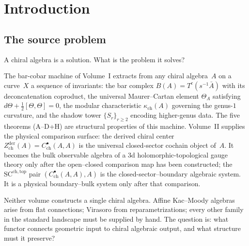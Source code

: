 \documentclass[11pt]{article}
\theoremstyle{plain}
\theoremstyle{definition}
\theoremstyle{remark}
\newcommand{\fgl}{\mathfrak{gl}}
\newcommand{\Eone}{E_1}
\newcommand{\Etwo}{E_2}
\newcommand{\Zder}{Z^{\mathrm{der}}_{\mathrm{ch}}}
\newcommand{\CoHA}{\mathrm{CoHA}}
\newcommand{\SCchtop}{\mathrm{SC}^{\mathrm{ch},\mathrm{top}}}
\begin{document}
\begin{abstract}
For toric CY$_3$, the functor interfaces with the critical
cohomological Hall algebra: $\CoHA(Q_X, W_X) \simeq
Y^+(\widehat{\fgl}_{Q_X})$ provides the $\Eone$-sector, and the
Drinfeld center recovers $\Etwo$-braiding.  The $\Eone$
stabilization theorem proves that for toric $GL(d)$-invariant local
models at $d \geq 3$, the relevant invariant Schouten--Nijenhuis
sector is silent. General CY categories acquire their $\Eone$ output
from Stage~2 and the CY degree shift.
\end{abstract}

\tableofcontents


\section{Introduction}\label{sec:intro}

\subsection{The source problem}

A chiral algebra is a solution.  What is the problem it solves?

The bar-cobar machine of Volume~I extracts from any chiral
algebra~$A$ on a curve~$X$ a sequence of invariants: the bar
complex $B(A) = T^c(s^{-1}\bar{A})$ with its deconcatenation
coproduct, the universal Maurer--Cartan element $\Theta_A$
satisfying $d\Theta + \frac{1}{2}[\Theta, \Theta] = 0$, the
modular characteristic $\kappa_{\mathrm{ch}}(A)$ governing the
genus-$1$ curvature, and the shadow tower
$\{S_r\}_{r \geq 2}$ encoding higher-genus data.  The five
theorems (A--D+H) are structural properties of this machine.
Volume~II supplies the physical comparison surface: the derived chiral
center $\Zder(A) = C^\bullet_{\mathrm{ch}}(A,A)$ is the universal
closed-sector cochain object of~$A$. It becomes the bulk observable
algebra of a 3d holomorphic-topological gauge theory only after the
open--closed comparison map has been constructed; the
$\SCchtop$ pair $(C^\bullet_{\mathrm{ch}}(A,A), A)$
is the closed-sector--boundary algebraic system. It is a physical
boundary--bulk system only after that comparison.

Neither volume constructs a single chiral algebra.  Affine
Kac--Moody algebras arise from flat connections; Virasoro from
reparametrizations; every other family in the standard landscape
must be supplied by hand.  The question is: what functor connects
geometric input to chiral algebraic output, and what structure
must it preserve?
\end{document}
